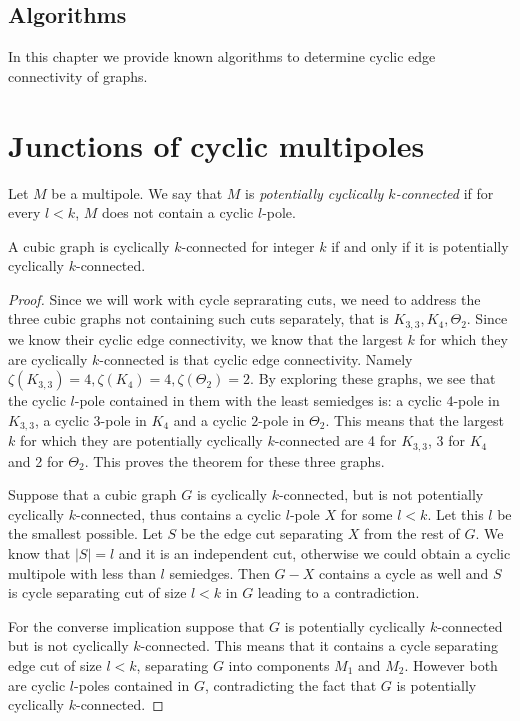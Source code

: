 \documentclass[12pt, twoside]{book}
\begin{document}
\section{Algorithms}\label{sec:algorithms}

In this chapter we provide known algorithms to determine cyclic edge connectivity of graphs.

\chapter{Junctions of cyclic multipoles}

\begin{definition}
	Let $M$ be a multipole. We say that $M$ is \textit{potentially cyclically $k$-connected} if for every $l < k$, $M$ does not contain a cyclic $l$-pole.
\end{definition}

\begin{lemma}\label{lem:graphs-potential-and-normal-cyclic-connected-eq}
	A cubic graph is cyclically $k$-connected for integer $k$ if and only if it is potentially cyclically $k$-connected.
\end{lemma}

\begin{proof}
	Since we will work with cycle seprarating cuts, we need to address the three cubic graphs not containing such cuts separately, that is $K_{3,3}, K_4, \Theta_2$. Since we know their cyclic edge connectivity, we know that the largest $k$ for which they are cyclically $k$-connected is that cyclic edge connectivity. Namely $\zeta(K_{3,3})=4, \zeta(K_4)=4, \zeta(\Theta_2)=2$. By exploring these graphs, we see that the cyclic $l$-pole contained in them with the least semiedges is: a cyclic $4$-pole in $K_{3,3}$, a cyclic $3$-pole in $K_4$ and a cyclic $2$-pole in $\Theta_2$. This means that the largest $k$ for which they are potentially cyclically $k$-connected are 4 for $K_{3,3}$, 3 for $K_4$ and 2 for $\Theta_2$. This proves the theorem for these three graphs.
	
	Suppose that a cubic graph $G$ is cyclically $k$-connected, but is not potentially cyclically $k$-connected, thus contains a cyclic $l$-pole $X$ for some $l<k$. Let this $l$ be the smallest possible. Let $S$ be the edge cut separating $X$ from the rest of $G$. We know that $|S|=l$ and it is an independent cut, otherwise we could obtain a cyclic multipole with less than $l$ semiedges. Then $G-X$ contains a cycle as well and $S$ is cycle separating cut of size $l<k$ in $G$ leading to a contradiction.
	
	For the converse implication suppose that $G$ is potentially cyclically $k$-connected but is not cyclically $k$-connected. This means that it contains a cycle separating edge cut of size $l<k$, separating $G$ into components $M_1$ and $M_2$. However both are cyclic $l$-poles contained in $G$, contradicting the fact that $G$ is potentially cyclically $k$-connected.
\end{proof}
\end{document}
